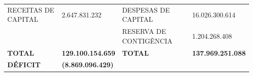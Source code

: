 \documentclass{article}
\begin{document}
\begin{longtable}[c]{m{4cm}|m{2cm}|m{4cm}|m{2cm}}
\multicolumn{1}{L{6cm}}{RECEITAS DE CAPITAL} & \multicolumn{1}{R{3cm}}{2.647.831.232} & \multicolumn{1}{L{6cm}}{ \hspace{1cm} DESPESAS DE CAPITAL} & \multicolumn{1}{R{2.5cm}}{16.026.300.614} \\
\multicolumn{1}{L{6cm}}{} & \multicolumn{1}{R{3cm}}{} & \multicolumn{1}{L{6cm}}{ \hspace{1cm} RESERVA DE CONTIGÊNCIA} & \multicolumn{1}{R{2.5cm}}{1.204.268.408} \\
\multicolumn{1}{L{6cm}}{ \textbf{TOTAL}} & \multicolumn{1}{R{3cm}}{ \textbf{129.100.154.659}} & \multicolumn{1}{L{6cm}}{ \textbf{ \hspace{1cm}TOTAL}} & \multicolumn{1}{R{2.5cm}}{ \textbf{137.969.251.088}} \\
\multicolumn{1}{L{6cm}}{ \textbf{DÉFICIT}} & \multicolumn{1}{R{3cm}}{ \textbf{(8.869.096.429)}} & \multicolumn{1}{L{6cm}}{ \textbf{ \hspace{1cm}}} & \multicolumn{1}{R{2.5cm}}{ \textbf{}} \\\hline\hline\hline\hline\end{longtable}\raggedright\fontsize{7pt}{10pt}\selectfont {Fonte: PPO.}\\\fontsize{7pt}{10pt}\selectfont {ELABORAÇÃO: DCAF/SCPPO/SEPLAG}\\\fontsize{7pt}{10pt}\selectfont {NOTA: Com intuito de evitar a dupla contagem na elaboração desse relatório, foram desconsiderados os valores referentes às operações intra-orçamentárias.}\\
\end{document}
